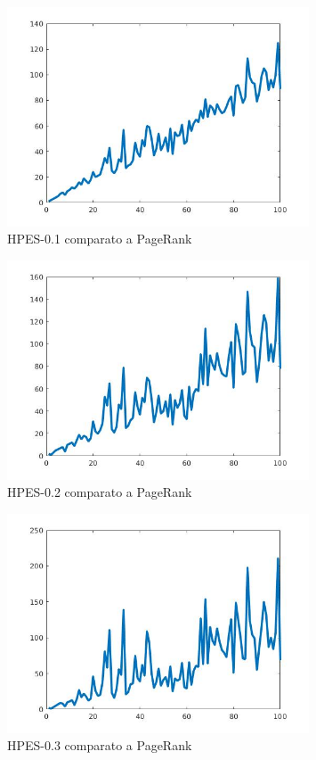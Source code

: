 \documentclass[12pt,a4paper]{amsart}
\numberwithin{equation}{section}
\theoremstyle{plain}
\theoremstyle{definition}
\begin{document}
\begin{figure}[H]
\caption{HPES-0.1 comparato a PageRank}
\centering
\includegraphics[width=0.8\textwidth]{primo.jpg}
\end{figure}
\begin{figure}[H]
\caption{HPES-0.2 comparato a PageRank}
\centering
\includegraphics[width=0.8\textwidth]{secondo.jpg}
\end{figure}
\begin{figure}[H]
\caption{HPES-0.3 comparato a PageRank}
\centering
\includegraphics[width=0.8\textwidth]{terzo.jpg}
\end{figure}
\end{document}
